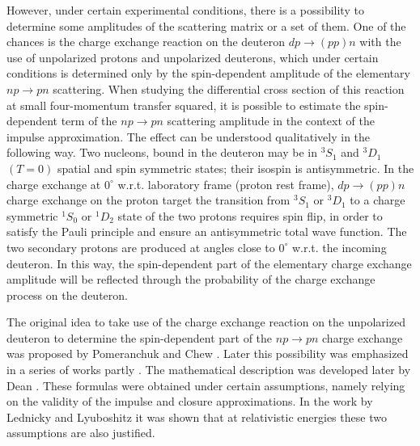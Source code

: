 \documentclass[twocolumn,epjc3]{svjour3}
\newcommand{\np}     {\ensuremath{np \rightarrow pn}\xspace}
\newcommand{\dpchex} {\ensuremath{dp \rightarrow (pp)n}\xspace}
\providecommand{\DIFaddtex}[1]{{\protect\color{Green} \sf #1}} %
\providecommand{\DIFdeltex}[1]{{\protect\color{Red} \scriptsize #1}} %
\providecommand{\DIFaddbegin}{} %
\providecommand{\DIFaddend}{} %
\providecommand{\DIFdelbegin}{} %
\providecommand{\DIFdelend}{} %
\providecommand{\DIFadd}[1]{\texorpdfstring{\DIFaddtex{#1}}{#1}} %
\providecommand{\DIFdel}[1]{\texorpdfstring{\DIFdeltex{#1}}{}} %
\newcommand{\DIFscaledelfig}{0.5}
\newlength{\DIFdelgraphicswidth} %
\newlength{\DIFdelgraphicsheight} %
\newcommand{\DIFaddincludegraphics}[2][]{{\color{blue}\fbox{\DIFOincludegraphics[#1]{#2}}}} %
\newcommand{\DIFdelincludegraphics}[2][]{%
\sbox{\DIFdelgraphicsbox}{\DIFOincludegraphics[#1]{#2}}%
\settoboxwidth{\DIFdelgraphicswidth}{\DIFdelgraphicsbox} %
\settoboxtotalheight{\DIFdelgraphicsheight}{\DIFdelgraphicsbox} %
\scalebox{\DIFscaledelfig}{%
\parbox[b]{\DIFdelgraphicswidth}{\usebox{\DIFdelgraphicsbox}\\[-\baselineskip] \rule{\DIFdelgraphicswidth}{0em}}\llap{\resizebox{\DIFdelgraphicswidth}{\DIFdelgraphicsheight}{%
\setlength{\unitlength}{\DIFdelgraphicswidth}%
\begin{picture}(1,1)%
\thicklines\linethickness{2pt} %
{\color[rgb]{1,0,0}\put(0,0){\framebox(1,1){}}}%
{\color[rgb]{1,0,0}\put(0,0){\line( 1,1){1}}}%
{\color[rgb]{1,0,0}\put(0,1){\line(1,-1){1}}}%
\end{picture}%
}\hspace*{3pt}}} %
} %
\DeclareRobustCommand{\DIFaddbegin}{\DIFOaddbegin \let\includegraphics\DIFaddincludegraphics} %
\DeclareRobustCommand{\DIFaddend}{\DIFOaddend \let\includegraphics\DIFOincludegraphics} %
\DeclareRobustCommand{\DIFdelbegin}{\DIFOdelbegin \let\includegraphics\DIFdelincludegraphics} %
\DeclareRobustCommand{\DIFdelend}{\DIFOaddend \let\includegraphics\DIFOincludegraphics} %
\begin{document}
However, under certain experimental conditions, there is a possibility to
determine some amplitudes of the scattering matrix or a set of them. One of the
chances is the charge exchange reaction on the deuteron \dpchex with the use of
unpolarized protons and unpolarized deuterons, which under certain conditions is
determined only by the spin-dependent amplitude of the elementary \np
scattering. When studying the differential cross section of this reaction at
small four-momentum transfer squared, it is possible to estimate the
spin-dependent term of the \np scattering amplitude in the context of the
impulse approximation. The effect can be understood qualitatively in the
following way. Two nucleons, bound in the deuteron may be in $^3S_1$ and $^3D_1$
$(T = 0)$ spatial and spin symmetric states; their isospin is antisymmetric. In
the \DIFdelbegin \DIFdel{charge exchange at $0^\circ$ w.r.t. laboratory frame (proton rest frame),
}\DIFdelend \DIFaddbegin \dpchex \DIFadd{charge exchange on the proton target }\DIFaddend the transition from $^3S_1$ or
$^3D_1$ to a charge symmetric $^1S_0$ or $^1D_2$ state of the two protons
requires spin flip, in order to satisfy the Pauli principle and ensure an
antisymmetric total wave function. \DIFaddbegin \DIFadd{The two secondary protons are produced at
angles close to $0^\circ$ w.r.t. the incoming deuteron. }\DIFaddend In this way, the
spin-dependent part of the elementary charge exchange amplitude will be
reflected through the probability of the charge exchange process on the
deuteron.

The original idea to take use of the charge exchange reaction on the unpolarized
deuteron to determine the spin-dependent part of the \np charge exchange was
proposed by Pomeranchuk \cite{pom51} and Chew \cite{chew51}. Later this
possibility was emphasized in a series of works
\DIFdelbegin \DIFdel{partly
}\DIFdelend \cite{mig55,pom51_2,lap57,dea72,dea72_2,ala75,ala75_2,bug87}. The mathematical
description was developed later by Dean \cite{dea72,dea72_2}. These formulas
were obtained under certain assumptions, namely relying on the validity of the
impulse and closure approximations. In the work by Lednicky and Lyuboshitz
\cite{led04} it was shown that at relativistic energies these two assumptions
are also justified.
\end{document}

